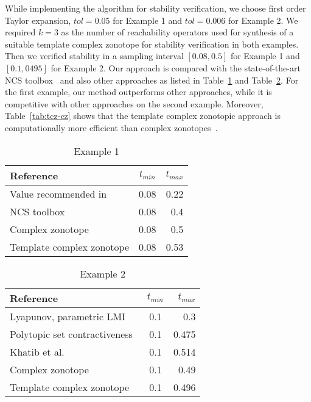 While implementing the algorithm for stability
verification, we choose first order Taylor expansion, $tol=0.05$ for
Example 1 and $tol=0.006$ for Example 2.  We required $k=3$ as the
number of reachability operators used for synthesis of a suitable
template complex zonotope for stability verification in both examples.
Then we verified stability in a sampling interval $[0.08, 0.5]$ for
Example 1 and $[0.1,0495]$ for Example 2.  Our approach is compared
with the state-of-the-art NCS toolbox~\cite{BauLoo_NECSYS12a} and also
other approaches as listed in Table~\ref{tab:com1} and
Table~\ref{tab:com2}.  For the first example, our method outperforms
other approaches, while it is competitive with other approaches on the
second example.  Moreover, Table~\ref{tab:tcz-cz} shows that the
template complex zonotopic approach is computationally more efficient
than complex zonotopes~\cite{arvind2016lis}.

\begin{table}
{\caption{Example 1}
\begin{tabular}{|l|c|r|}
  \hline
  Reference & $t_{min}$ & $t_{max}$ \\
\hline
Value recommended in~\cite{wittenmark2002computer} & 0.08 & 0.22\\
  \hline
  NCS toolbox~\cite{BauLoo_NECSYS12a} & 0.08 & 0.4 \\
  \hline
Complex zonotope~\cite{arvind2016lis} & 0.08 & 0.5 \\
\hline
  Template complex zonotope & 0.08 & 0.53 \\
  \hline
\end{tabular}
\label{tab:com1}
}
\end{table}
\begin{table}
{\caption{Example 2}
\label{tab:com2}
\begin{tabular}{|l|c|r|}
\hline
    Reference & $t_{min}$ & $t_{max}$ \\
  \hline
  Lyapunov, parametric LMI~\cite{2013hetel} & 0.1 & 0.3 \\
  \hline
  Polytopic set contractiveness~\cite{2014-fiacchini-set} & 0.1 & 0.475 \\
  \hline
Khatib et al.~\cite{AlKhatib2015} & 0.1 & 0.514\\
\hline
Complex zonotope~\cite{arvind2016lis} & 0.1 & 0.49 \\
\hline
  Template complex zonotope & 0.1 & 0.496 \\
  \hline
\end{tabular}
}
\end{table}


